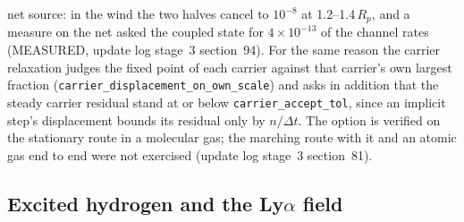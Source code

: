 net source: in the wind the two halves cancel to $10^{-8}$ at
1.2--1.4\,$R_p$, and a measure on the net asked the coupled state for
$4\times10^{-13}$ of the channel rates (MEASURED, update log stage~3
section~94). For the same reason the carrier relaxation judges the fixed
point of each carrier against that carrier's own largest fraction
(\texttt{carrier\_displacement\_on\_own\_scale}) and asks in addition that
the steady carrier residual stand at or below \texttt{carrier\_accept\_tol},
since an implicit step's displacement bounds its residual only by $n/\Delta
t$. The option is verified on the stationary route in a molecular gas; the
marching route with it and an atomic gas end to end were not exercised (update
log stage~3 section~81).

\subsection{\texorpdfstring{Excited hydrogen and the Ly$\alpha$ field}{Excited hydrogen and the Lyman-alpha field}}
\label{sec:ionization:n2}

